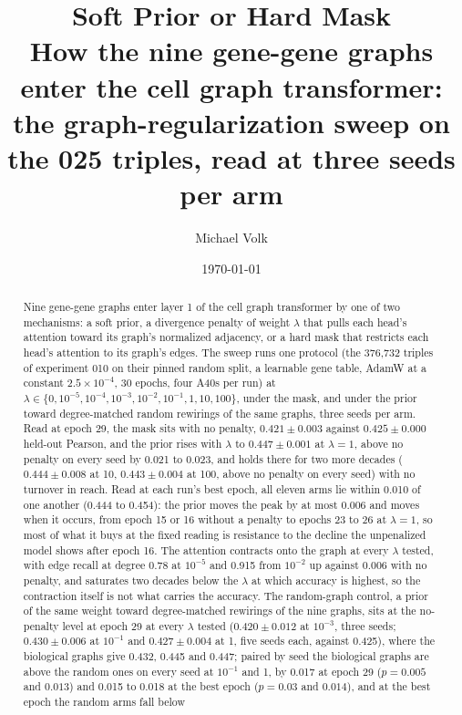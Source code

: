 \documentclass[10pt,a4paper]{article}
\title{\vspace{-1.5em}Soft Prior or Hard Mask\\
  {\large How the nine gene-gene graphs enter the cell graph transformer:
   the graph-regularization sweep on the 025 triples, read at three seeds per arm}}
\author{Michael Volk}
\date{\today}
\begin{document}
\maketitle
\thispagestyle{empty}

\begin{abstract}
\noindent
Nine gene-gene graphs enter layer 1 of the cell graph transformer by one of two
mechanisms: a soft prior, a divergence penalty of weight $\lambda$ that pulls each
head's attention toward its graph's normalized adjacency, or a hard mask that restricts
each head's attention to its graph's edges. The sweep runs one protocol (the 376{,}732
triples of experiment 010 on their pinned random split, a learnable gene table, AdamW at
a constant $2.5 \times 10^{-4}$, 30 epochs, four A40s per run) at $\lambda \in \{0,
10^{-5}, 10^{-4}, 10^{-3}, 10^{-2}, 10^{-1}, 1, 10, 100\}$, under the mask, and under
the prior toward degree-matched random rewirings of the same graphs, three
seeds per arm. Read at epoch 29, the mask sits with no penalty, $0.421 \pm 0.003$ against
$0.425 \pm 0.000$ held-out Pearson, and the prior rises with $\lambda$ to $0.447 \pm
0.001$ at $\lambda = 1$, above no penalty on every seed by 0.021 to 0.023, and holds
there for two more decades ($0.444 \pm 0.008$ at 10, $0.443 \pm 0.004$ at 100, above no
penalty on every seed) with no turnover in reach. Read at each run's best epoch, all
eleven arms lie within 0.010 of one
another (0.444 to 0.454): the prior moves the peak by at most 0.006 and moves when it
occurs, from epoch 15 or 16 without a penalty to epochs 23 to 26 at $\lambda = 1$, so most
of what it buys at the fixed reading is resistance to the decline the unpenalized model
shows after epoch 16. The attention contracts onto the graph at every $\lambda$ tested,
with edge recall at degree 0.78 at $10^{-5}$ and 0.915 from $10^{-2}$ up against 0.006
with no penalty, and saturates two decades below the $\lambda$ at which accuracy is
highest, so the contraction itself is not what carries the accuracy. The random-graph
control, a prior of the same weight toward degree-matched rewirings of the nine graphs,
sits at the no-penalty level at epoch 29 at every $\lambda$ tested ($0.420 \pm 0.012$ at
$10^{-3}$, three seeds; $0.430 \pm 0.006$ at $10^{-1}$ and $0.427 \pm 0.004$ at 1, five
seeds each, against 0.425), where the biological graphs give 0.432, 0.445 and 0.447;
paired by seed the biological graphs are above the random ones on every seed at
$10^{-1}$ and 1, by 0.017 at epoch 29 ($p = 0.005$ and $0.013$) and 0.015 to 0.018 at
the best epoch ($p = 0.03$ and $0.014$), and at the best epoch the random arms fall below

\end{abstract}
\end{document}

